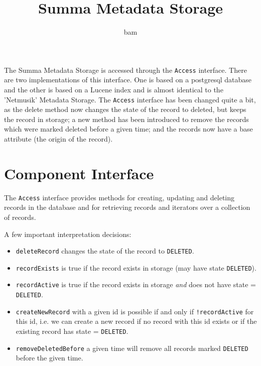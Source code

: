 \documentclass[a4paper,12pt]{article}
\title{Summa Metadata Storage}
\author{bam}
\begin{document}
\maketitle


The Summa Metadata Storage is accessed through the \texttt{Access}
interface.  There are two implementations of this interface. One is
based on a postgresql database and the other is based on a Lucene
index and is almost identical to the 'Netmusik' Metadata Storage. The
\texttt{Access} interface has been changed quite a bit, as the delete
method now changes the state of the record to deleted, but keeps the
record in storage; a new method has been introduced to remove the
records which were marked deleted before a given time; and the records
now have a base attribute (the origin of the record).

\section{Component Interface}

The \texttt{Access} interface provides methods for creating,
updating and deleting records in the database and for retrieving
records and iterators over a collection of records.
 

A few important interpretation decisions:
\begin{itemize}
\item{\texttt{deleteRecord} changes the state of the record to
  \texttt{DELETED}.}
\item{\texttt{recordExists} is true if the record exists in storage
  (may have state \texttt{DELETED}).}
\item{\texttt{recordActive} is true if the record exists in storage
  \emph{and} does not have state = \texttt{DELETED}.}
\item{\texttt{createNewRecord} with a given id is possible if and only
if \texttt{!recordActive} for this id, i.e. we can create a new record
if no record with this id exists or if the existing record has state =
\texttt{DELETED}.}
\item{\texttt{removeDeletedBefore} a given time will remove all
  records marked \texttt{DELETED} before the given time.}
\end{itemize}
\end{document}
